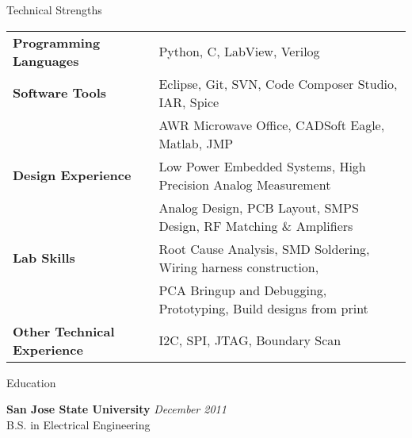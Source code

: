 \documentclass{resume} %
\begin{document}
\begin{rSection}{Technical Strengths}

\begin{tabular}{ @{} >{\bfseries}l @{\hspace{6ex}} l }
Programming Languages & Python, C, LabView, Verilog \smallskip \\

Software Tools & Eclipse, Git, SVN, Code Composer Studio, IAR, Spice\\ 
 & AWR Microwave Office, CADSoft Eagle, Matlab, JMP \smallskip \\

Design Experience & Low Power Embedded Systems, High Precision Analog Measurement \\ 
 & Analog Design, PCB Layout, SMPS Design, RF Matching \& Amplifiers \smallskip \\
 
Lab Skills & Root Cause Analysis, SMD Soldering, Wiring harness construction,\\
 & PCA Bringup and Debugging, Prototyping, Build designs from print\smallskip \\
 
Other Technical Experience & I2C, SPI, JTAG, Boundary Scan \\
\end{tabular}

\end{rSection}
\medskip

\pagebreak[3]
\begin{rSection}{Education}

{\bf San Jose State University} \hfill {\em December 2011} \\ 
B.S. in Electrical Engineering \\

\end{rSection}





\end{document}
